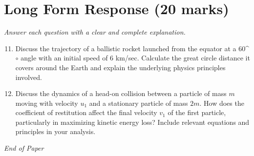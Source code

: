 \documentclass[12pt]{article}
\begin{document}
\section*{Long Form Response (20 marks)}
\textit{Answer each question with a clear and complete explanation.}
\begin{enumerate}[label=\arabic*.]
\setcounter{enumi}{10}
\item Discuss the trajectory of a ballistic rocket launched from the equator at a 60^\ensuremath{\circ} angle with an initial speed of 6 km/sec. Calculate the great circle distance it covers around the Earth and explain the underlying physics principles involved.
\item Discuss the dynamics of a head-on collision between a particle of mass $m$ moving with velocity $u_1$ and a stationary particle of mass $2 m$. How does the coefficient of restitution affect the final velocity $v_1$ of the first particle, particularly in maximizing kinetic energy loss? Include relevant equations and principles in your analysis.
\end{enumerate}

\vfill
\noindent\textit{End of Paper}
\end{document}
